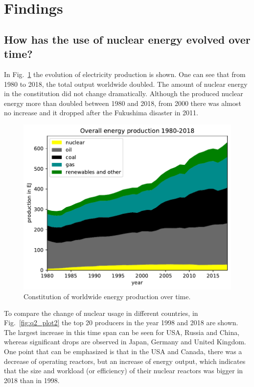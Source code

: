 \documentclass[a4paper,10pt,twocolumn]{scrartcl}
\begin{document}
\section{Findings}

\subsection{How has the use of nuclear energy evolved over time?}

In Fig.~\ref{fig:q1_plot1} the evolution of electricity production is shown. One can see that from 1980 to 2018, the total output worldwide doubled. The amount of nuclear energy in the constitution did not change dramatically. Although the produced nuclear energy more than doubled between 1980 and 2018, from 2000 there was almost no increase and it dropped after the Fukushima disaster in 2011.

\begin{figure}[h]
	\centering
 	\includegraphics[width=\columnwidth]{../figures/q1_plot1.pdf}
 	\caption{Constitution of worldwide energy production over time.}
 	\label{fig:q1_plot1}
\end{figure}

To compare the change of nuclear usage in different countries, in Fig.~\ref{fig:q2_plot2} the top 20 producers in the year 1998 and 2018 are shown. The largest increase in this time span can be seen for USA, Russia and China, whereas significant drops are observed in Japan, Germany and United Kingdom. One point that can be emphasized is that in the USA and Canada, there was a decrease of operating reactors, but an increase of energy output, which indicates that the size and workload (or efficiency) of their nuclear reactors was bigger in 2018 than in 1998.
\end{document}
